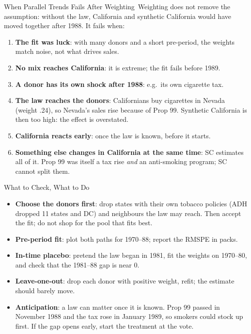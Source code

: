 \documentclass[aspectratio=169,11pt,xcolor=dvipsnames]{beamer}
\newcommand{\core}{\,\raisebox{0.6pt}{\textcolor{corestar}{$\bigstar$}}}
\begin{document}
\begin{frame}{When Parallel Trends Fails After Weighting\core}
Weighting does not remove the assumption: without the law, California and
synthetic California would have moved together after 1988. It fails when:
\begin{enumerate}\itemsep2pt
  \item \textbf{The fit was luck}: with many donors and a short pre-period, the
        weights match noise, not what drives sales.
  \item \textbf{No mix reaches California}: it is extreme; the fit fails before 1989.
  \item \textbf{A donor has its own shock after 1988}: e.g.\ its own cigarette tax.
  \item \textbf{The law reaches the donors}: Californians buy cigarettes in
        Nevada (weight .24), so Nevada's sales rise because of Prop 99.
        Synthetic California is then too high: the effect is overstated.
  \item \textbf{California reacts early}: once the law is known, before it starts.
  \item \textbf{Something else changes in California at the same time}: SC
        estimates all of it. Prop 99 was itself a tax rise \emph{and} an
        anti-smoking program; SC cannot split them.
\end{enumerate}
\end{frame}

\begin{frame}{What to Check, What to Do\core}
\begin{itemize}\itemsep3pt
  \item \textbf{Choose the donors first}: drop states with their own tobacco
        policies (ADH dropped 11 states and DC) and neighbours the law may reach.
        Then accept the fit; do not shop for the pool that fits best.
  \item \textbf{Pre-period fit}: plot both paths for 1970--88; report the RMSPE
        in packs.
  \item \textbf{In-time placebo}: pretend the law began in 1981, fit the weights
        on 1970--80, and check that the 1981--88 gap is near 0.
  \item \textbf{Leave-one-out}: drop each donor with positive weight, refit; the
        estimate should barely move.
  \item \textbf{Anticipation}: a law can matter once it is known. Prop 99 passed
        in November 1988 and the tax rose in January 1989, so smokers could stock
        up first. If the gap opens early, start the treatment at the vote.
\end{itemize}
\end{frame}
\end{document}
